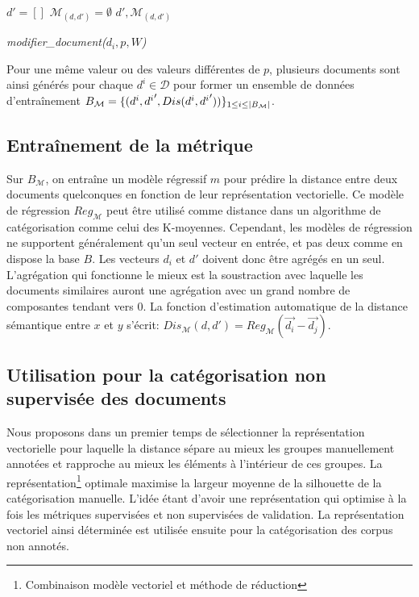 \begin{algorithm}[!htb] %
	\footnotesize
 ${d'} = [] $\; 
 $\mathcal{M}_{(d,d')} = \emptyset$\;
 \Return $d', \mathcal{M}_{(d,d')}$\;
 \caption{\textit{modifier\_document($d_i, p, W$)}} \label{algo:similarite:modifierdoc}
\end{algorithm}

Pour une même valeur ou des valeurs différentes de $p$, plusieurs documents sont ainsi générés pour chaque $d^i \in \mathcal{D}$ pour former un ensemble de données d'entraînement $B_\mathcal{M} = \lbrace (d^i, {d^i}', {Dis}(d^i, {d^i}'))\rbrace_{1 \leq i \leq {\vert B_\mathcal{M}\vert}}$.

\subsection{Entraînement de la métrique}

Sur $B_\mathcal{M}$, on entraîne un modèle régressif $m$ pour prédire la distance entre deux documents quelconques en fonction de leur représentation vectorielle. Ce modèle de régression $Reg_\mathcal{M}$ peut être utilisé comme distance dans un algorithme de catégorisation comme celui des K-moyennes. Cependant, les modèles de régression ne supportent généralement qu'un seul vecteur en entrée, et pas deux comme en dispose la base $B$. Les vecteurs $d_i$ et $d'$ doivent donc être agrégés en un seul. L'agrégation qui fonctionne le mieux est la soustraction avec laquelle les documents similaires auront une agrégation avec un grand nombre de composantes tendant vers 0. La fonction d'estimation automatique de la distance sémantique entre $x$ et $y$ s'écrit: $Dis_\mathcal{M}(d, d') = Reg_\mathcal{M}(\vec{d_{i}} - \vec{d_{j}})$. 

\subsection{Utilisation pour la catégorisation non supervisée des documents}
 Nous proposons dans un premier temps de sélectionner la représentation vectorielle pour laquelle la distance sépare au mieux les groupes manuellement annotées et rapproche au mieux les éléments à l'intérieur de ces groupes. La représentation\footnote{Combinaison modèle vectoriel et méthode de réduction} optimale maximise la largeur moyenne de la silhouette de la catégorisation manuelle. L'idée étant d'avoir une représentation qui optimise à la fois les métriques supervisées et non supervisées de validation. La représentation vectoriel ainsi déterminée est utilisée ensuite pour la catégorisation des corpus non annotés. %

